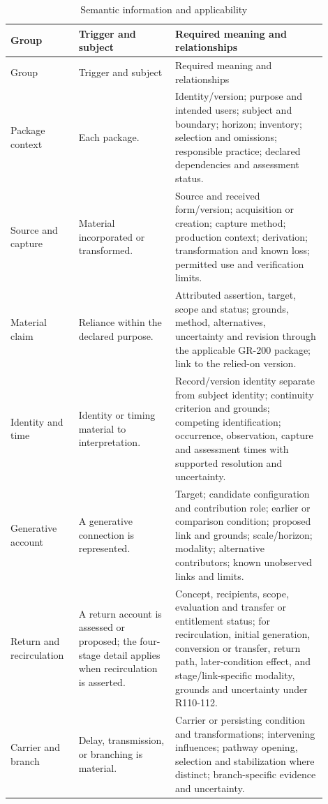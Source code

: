 \documentclass[11pt,a4paper]{article}
\begin{document}
\begin{longtable}{@{}L{0.18\linewidth}L{0.28\linewidth}L{0.44\linewidth}@{}}
\caption{Semantic information and applicability}\label{tab:r110-semantic}\\
\toprule
Group & Trigger and subject & Required meaning and relationships\\
\midrule\endfirsthead
\toprule
Group & Trigger and subject & Required meaning and relationships\\
\midrule\endhead
Package context & Each package. & Identity/version; purpose and intended users; subject and boundary; horizon; inventory; selection and omissions; responsible practice; declared dependencies and assessment status.\\
Source and capture & Material incorporated or transformed. & Source and received form/version; acquisition or creation; capture method; production context; derivation; transformation and known loss; permitted use and verification limits.\\
Material claim & Reliance within the declared purpose. & Attributed assertion, target, scope and status; grounds, method, alternatives, uncertainty and revision through the applicable GR-200 package; link to the relied-on version.\\
Identity and time & Identity or timing material to interpretation. & Record/version identity separate from subject identity; continuity criterion and grounds; competing identification; occurrence, observation, capture and assessment times with supported resolution and uncertainty.\\
Generative account & A generative connection is represented. & Target; candidate configuration and contribution role; earlier or comparison condition; proposed link and grounds; scale/horizon; modality; alternative contributors; known unobserved links and limits.\\
Return and recirculation & A return account is assessed or proposed; the four-stage detail applies when recirculation is asserted. & Concept, recipients, scope, evaluation and transfer or entitlement status; for recirculation, initial generation, conversion or transfer, return path, later-condition effect, and stage/link-specific modality, grounds and uncertainty under R110-112.\\
Carrier and branch & Delay, transmission, or branching is material. & Carrier or persisting condition and transformations; intervening influences; pathway opening, selection and stabilization where distinct; branch-specific evidence and uncertainty.\\

\end{longtable}
\end{document}
